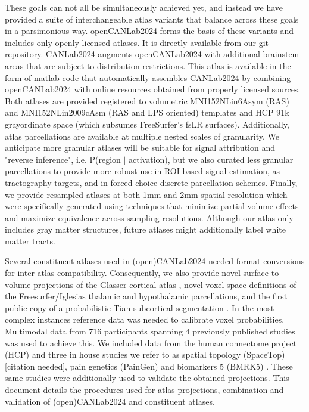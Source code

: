 \documentclass[10pt,letterpaper]{article}
\begin{document}
These goals can not all be simultaneously achieved yet, and instead we have provided a suite of interchangeable atlas variants that balance across these goals in a parsimonious way. openCANLab2024 forms the basis of these variants and includes only openly licensed atlases. It is directly available from our git repository. CANLab2024 augments openCANLab2024 with additional brainstem areas that are subject to distribution restrictions. This atlas is available in the form of matlab code that automatically assembles CANLab2024 by combining openCANLab2024 with online resources obtained from properly licensed sources. Both atlases are provided registered to volumetric MNI152NLin6Asym (RAS) and MNI152NLin2009cAsm (RAS and LPS oriented) templates and HCP 91k grayordinate space (which subsumes FreeSurfer's fsLR surfaces). Additionally, atlas parcellations are available at multiple nested scales of granularity. We anticipate more granular atlases will be suitable for signal attribution and "reverse inference", i.e. P(region $\vert$ activation), but we also curated less granular parcellations to provide more robust use in ROI based signal estimation, as tractography targets, and in forced-choice discrete parcellation schemes. Finally, we provide resampled atlases at both 1mm and 2mm spatial resolution which were specifically generated using techniques that minimize partial volume effects and maximize equivalence across sampling resolutions. Although our atlas only includes gray matter structures, future atlases might additionally label white matter tracts.

Several constituent atlases used in (open)CANLab2024 needed format conversions for inter-atlas compatibility. Consequently, we also provide novel surface to volume projections of the Glasser cortical atlas \cite{Glasser2016}, novel voxel space definitions of the Freesurfer/Iglesias thalamic \cite{Iglesias2018} and hypothalamic \cite{Billot2020} parcellations, and the first public copy of a probabilistic Tian subcortical segmentation \cite{Tian2020}. In the most complex instances reference data was needed to calibrate voxel probabilities. Multimodal data from 716 participants spanning 4 previously published studies was used to achieve this. We included data from the human connectome project (HCP)\cite{Vanessen2013} and three in house studies we refer to as spatial topology (SpaceTop) [citation needed], pain genetics (PainGen) \cite{Botvinik-Nezer2023.09.21.558825} and biomarkers 5 (BMRK5) \cite{Losin2020}. These same studies were additionally used to validate the obtained projections. This document details the procedures used for atlas projections, combination and validation of (open)CANLab2024 and constituent atlases.
\end{document}
